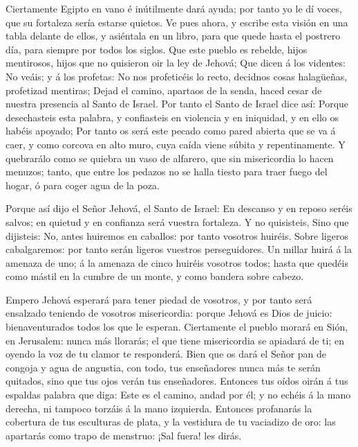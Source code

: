  Ciertamente Egipto en vano é inútilmente dará ayuda; por
tanto yo le dí voces, que su fortaleza sería estarse quietos.
 Ve pues ahora, y escribe esta visión en una tabla delante
de ellos, y asiéntala en un libro, para que quede hasta el postrero día,
para siempre por todos los siglos.  Que este pueblo es
rebelde, hijos mentirosos, hijos que no quisieron oir la ley de Jehová;
 Que dicen á los videntes: No veáis; y á los profetas: No
nos profeticéis lo recto, decidnos cosas halagüeñas, profetizad
mentiras;  Dejad el camino, apartaos de la senda, haced
cesar de nuestra presencia al Santo de Israel.  Por tanto
el Santo de Israel dice así: Porque desechasteis esta palabra, y
confiasteis en violencia y en iniquidad, y en ello os habéis apoyado;
 Por tanto os será este pecado como pared abierta que se va
á caer, y como corcova en alto muro, cuya caída viene súbita y
repentinamente.  Y quebrarálo como se quiebra un vaso de
alfarero, que sin misericordia lo hacen menuzos; tanto, que entre los
pedazos no se halla tiesto para traer fuego del hogar, ó para coger agua
de la poza.

 Porque así dijo el Señor Jehová, el Santo de Israel: En
descanso y en reposo seréis salvos; en quietud y en confianza será
vuestra fortaleza. Y no quisisteis,  Sino que dijisteis:
No, antes huiremos en caballos: por tanto vosotros huiréis. Sobre
ligeros cabalgaremos: por tanto serán ligeros vuestros perseguidores.
 Un millar huirá á la amenaza de uno; á la amenaza de cinco
huiréis vosotros todos; hasta que quedéis como mástil en la cumbre de un
monte, y como bandera sobre cabezo.

 Empero Jehová esperará para tener piedad de vosotros, y
por tanto será ensalzado teniendo de vosotros misericordia: porque
Jehová es Dios de juicio: bienaventurados todos los que le esperan.
 Ciertamente el pueblo morará en Sión, en Jerusalem: nunca
más llorarás; el que tiene misericordia se apiadará de ti; en oyendo la
voz de tu clamor te responderá.  Bien que os dará el Señor
pan de congoja y agua de angustia, con todo, tus enseñadores nunca más
te serán quitados, sino que tus ojos verán tus enseñadores.
 Entonces tus oídos oirán á tus espaldas palabra que diga:
Este es el camino, andad por él; y no echéis á la mano derecha, ni
tampoco torzáis á la mano izquierda.  Entonces profanarás
la cobertura de tus esculturas de plata, y la vestidura de tu vaciadizo
de oro: las apartarás como trapo de menstruo: ¡Sal fuera! les dirás.

